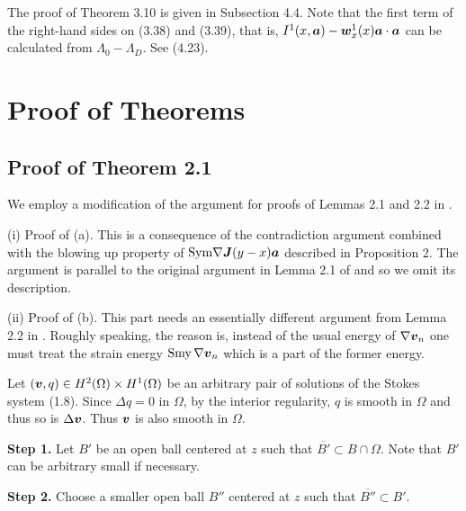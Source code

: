 \endproclaim


\noindent
The proof of Theorem 3.10 is given in Subsection 4.4.
Note that the first term of  the right-hand sides on  (3.38) and (3.39), that is, 
$I^1(x,\mbox{\boldmath $a$})-\mbox{\boldmath $w$}_x^1(x)\mbox{\boldmath $a$}\cdot\mbox{\boldmath $a$}$
can be calculated from
$\Lambda_0-\Lambda_D$.  See (4.23).












\section{Proof of Theorems}



\subsection{Proof of Theorem 2.1}


We employ a modification of the argument for proofs of Lemmas 2.1 and 2.2 in \cite{INew}.

\noindent
(i)  Proof of (a). 
This is a consequence of the contradiction argument combined with the blowing up property of 
$\text{Sym}\nabla\mbox{\boldmath $J$}(y-x)\mbox{\boldmath $a$}$ described in Proposition 2.
The argument is parallel to the original argument in Lemma 2.1 of \cite{INew} and so we omit its
description.




\noindent
(ii) Proof of (b).   This part needs an essentially different argument from Lemma 2.2 in \cite{INew}.
Roughly speaking, the reason is, instead of the usual energy of $\nabla\mbox{\boldmath $v$}_n$
one must treat the strain energy $\text{Smy}\,\nabla\mbox{\boldmath $v$}_n$ which is a part of the former
energy.


Let $(\mbox{\boldmath $v$}, q)\in H^2(\Omega)\times H^1(\Omega)$ be an arbitrary pair of solutions of the Stokes system (1.8).
Since $\Delta q=0$ in $\Omega$, by the interior regularity,  $q$ is smooth in $\Omega$ and thus so is $\Delta\mbox{\boldmath $v$}$.  Thus $\mbox{\boldmath $v$}$ is also smooth in $\Omega$. 

{\bf\noindent Step 1.}
Let $B'$ be an open ball centered at $z$ such that $\overline{B'}\subset B\cap\Omega$.
Note that $B'$ can be arbitrary small if necessary.

{\bf\noindent Step 2.}
Choose a smaller open ball $B''$ centered at $z$ such that $\overline{B''}\subset B'$.


